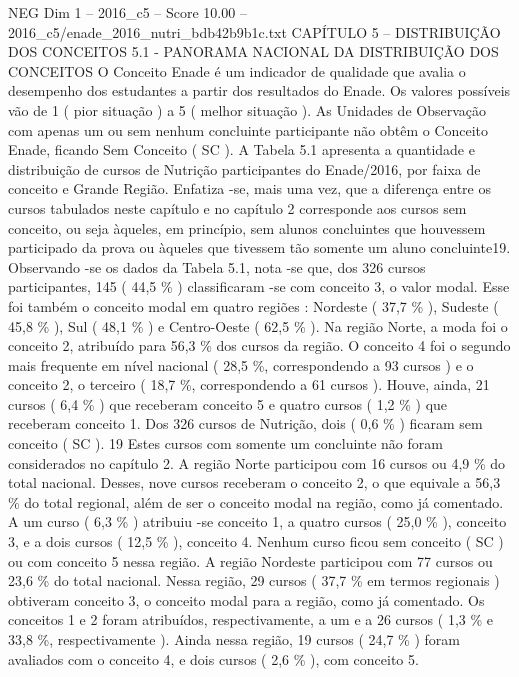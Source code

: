 \begin{textsample}{NEG Dim 1 – 2016\_c5 – Score 10.00 – 2016\_c5/enade\_2016\_nutri\_bdb42b9b1c.txt}  \label{ex:f1_neg_368}
CAPÍTULO 5 – DISTRIBUIÇÃO DOS CONCEITOS 5.1 - PANORAMA NACIONAL DA DISTRIBUIÇÃO DOS CONCEITOS O Conceito Enade é um indicador de qualidade que avalia o desempenho dos estudantes a partir dos resultados do Enade.
Os valores possíveis vão de 1 ( pior situação ) a 5 ( melhor situação ).
As Unidades de Observação com apenas um ou sem nenhum concluinte participante não obtêm o Conceito Enade, ficando Sem Conceito ( SC ).
A Tabela 5.1 apresenta a quantidade e distribuição de cursos de Nutrição participantes do Enade/2016, por faixa de conceito e Grande Região.
Enfatiza -se, mais uma vez, que a diferença entre os cursos tabulados neste capítulo e no capítulo 2 corresponde aos cursos sem conceito, ou seja àqueles, em princípio, sem alunos concluintes que houvessem participado da prova ou àqueles que tivessem tão somente um aluno concluinte19.
Observando -se os dados da Tabela 5.1, nota -se que, dos 326 cursos participantes, 145 ( 44,5 \% ) classificaram -se com conceito 3, o valor modal.
Esse foi também o conceito modal em quatro regiões : Nordeste ( 37,7 \% ), Sudeste ( 45,8 \% ), Sul ( 48,1 \% ) e Centro-Oeste ( 62,5 \% ).
Na região Norte, a moda foi o conceito 2, atribuído para 56,3 \% dos cursos da região.
O conceito 4 foi o segundo mais frequente em nível nacional ( 28,5 \%, correspondendo a 93 cursos ) e o conceito 2, o terceiro ( 18,7 \%, correspondendo a 61 cursos ).
Houve, ainda, 21 cursos ( 6,4 \% ) que receberam conceito 5 e quatro cursos ( 1,2 \% ) que receberam conceito 1.
Dos 326 cursos de Nutrição, dois ( 0,6 \% ) ficaram sem conceito ( SC ). 19 Estes cursos com somente um concluinte não foram considerados no capítulo 2.
A região Norte participou com 16 cursos ou 4,9 \% do total nacional.
Desses, nove cursos receberam o conceito 2, o que equivale a 56,3 \% do total regional, além de ser o conceito modal na região, como já comentado.
A um curso ( 6,3 \% ) atribuiu -se conceito 1, a quatro cursos ( 25,0 \% ), conceito 3, e a dois cursos ( 12,5 \% ), conceito 4.
Nenhum curso ficou sem conceito ( SC ) ou com conceito 5 nessa região.
A região Nordeste participou com 77 cursos ou 23,6 \% do total nacional.
Nessa região, 29 cursos ( 37,7 \% em termos regionais ) obtiveram conceito 3, o conceito modal para a região, como já comentado.
Os conceitos 1 e 2 foram atribuídos, respectivamente, a um e a 26 cursos ( 1,3 \% e 33,8 \%, respectivamente ).
Ainda nessa região, 19 cursos ( 24,7 \% ) foram avaliados com o conceito 4, e dois cursos ( 2,6 \% ), com conceito 5.

\end{textsample}
